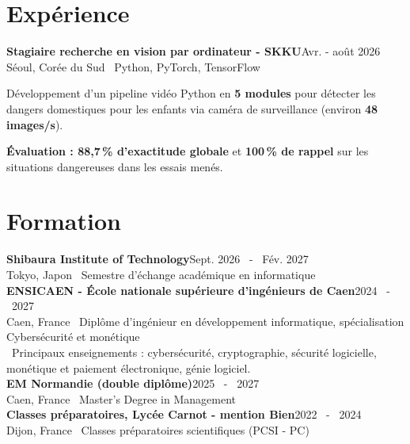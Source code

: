 \documentclass[10pt,a4paper]{article}
\newcommand{\role}[3]{\textbf{\color{ink}#1}\hfill {\color{muted}\footnotesize #2}\\[-1pt]{\color{muted}\footnotesize #3}\par\vspace{3pt}}
\newcommand{\sm}[1]{{\fontsize{8.5}{10.2}\selectfont #1}}
\begin{document}
\section{Expérience}
\role{Stagiaire recherche en vision par ordinateur \textnormal{- SKKU}}{Avr. - août 2026}{Séoul, Corée du Sud \textbar\ Python, PyTorch, TensorFlow}
\begin{itemize}\sm{
\item Développement d'un pipeline vidéo Python en \textbf{5 modules} pour détecter les dangers domestiques pour les enfants via caméra de surveillance (environ \textbf{48 images/s}).
\item \textbf{Évaluation : 88,7\,\% d'exactitude globale} et \textbf{100\,\% de rappel} sur les situations dangereuses dans les essais menés.
}\end{itemize}

\section{Formation}
\sm{\textbf{Shibaura Institute of Technology}\hfill\textcolor{muted}{Sept. 2026 \ - \ Fév. 2027}\\
\textcolor{muted}{Tokyo, Japon \textbar\ Semestre d'échange académique en informatique}\\[3pt]
\textbf{ENSICAEN - École nationale supérieure d'ingénieurs de Caen}\hfill\textcolor{muted}{2024 \ - \ 2027}\\
\textcolor{muted}{Caen, France \textbar\ Diplôme d'ingénieur en développement informatique, spécialisation Cybersécurité et monétique}\\[-1pt]
\textbullet\ Principaux enseignements : cybersécurité, cryptographie, sécurité logicielle, monétique et paiement électronique, génie logiciel.\\[3pt]
\textbf{EM Normandie (double diplôme)}\hfill\textcolor{muted}{2025 \ - \ 2027}\\
\textcolor{muted}{Caen, France \textbar\ Master's Degree in Management}\\[3pt]
\textbf{Classes préparatoires, Lycée Carnot - mention Bien}\hfill\textcolor{muted}{2022 \ - \ 2024}\\
\textcolor{muted}{Dijon, France \textbar\ Classes préparatoires scientifiques (PCSI - PC)}}
\end{document}
